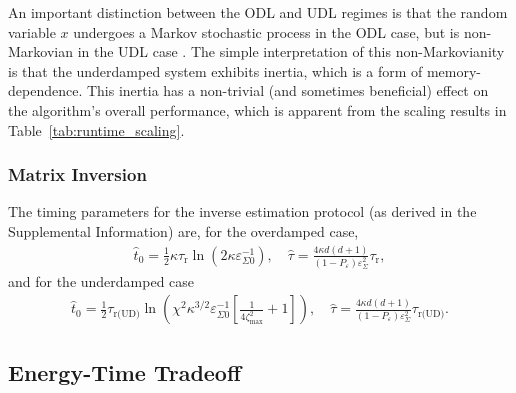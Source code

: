 \documentclass[prx,onecolumn,floatfix,longbibliography,notitlepage, nofootinbib]{revtex4-1}
\begin{document}
An important distinction between the ODL and UDL regimes is that the random variable $x$ undergoes a Markov stochastic process in the ODL case, but is non-Markovian in the UDL case \cite{doerries2021correlation,h1989colored}. The simple interpretation of this non-Markovianity is that the underdamped system exhibits inertia, which is a form of memory-dependence. This inertia has a non-trivial (and sometimes beneficial) effect on the algorithm's overall performance, which is apparent from the scaling results in Table~\ref{tab:runtime_scaling}.





\subsubsection{Matrix Inversion}

The timing parameters for the inverse estimation protocol (as derived in the Supplemental Information) are, for the overdamped case,
\begin{align}
\label{eq:t0-tau-inverse-odl}
\widehat{t}_0 =
 \frac{1}{2} \kappa \tau_\text{r}\ln\left(2\kappa\varepsilon_{\Sigma 0}^{-1}\right),\quad
    \widehat{\tau} = \frac{4 \kappa d(d+1)}{(1-P_\varepsilon)\varepsilon_\Sigma^2}\tau_\text{r},
\end{align}
and for the underdamped case
\begin{align}
\label{eq:t0-tau-inverse-udl}
\widehat{t}_0 = \frac{1}{2} \tau_\text{r(UD)}\ln\left(\chi^2 \kappa^{3/2}\varepsilon_{\Sigma0}^{-1}\left[\frac{1}{4\zeta_\text{max}^{2}}+1\right]\right),\quad
    \widehat{\tau} =\frac{4 \kappa d(d+1)}{(1-P_\varepsilon)\varepsilon_\Sigma^2}\tau_\text{r(UD)}.
\end{align}




\subsection{Energy-Time Tradeoff}
\end{document}
